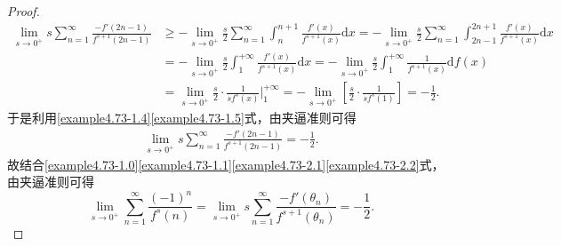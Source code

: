 \documentclass[../../main.tex]{subfiles}%
\begin{document}
\begin{proof}
\begin{align}
\underset{s\rightarrow 0^+}{\lim}s\sum_{n=1}^{\infty}{\frac{-f'\left( 2n-1 \right)}{f^{s+1}\left( 2n-1 \right)}}&\geqslant -\underset{s\rightarrow 0^+}{\lim}\frac{s}{2}\sum_{n=1}^{\infty}{\int_n^{n+1}{\frac{f'\left( x \right)}{f^{s+1}\left( x \right)}\mathrm{d}x}}=-\underset{s\rightarrow 0^+}{\lim}\frac{s}{2}\sum_{n=1}^{\infty}{\int_{2n-1}^{2n+1}{\frac{f'\left( x \right)}{f^{s+1}\left( x \right)}\mathrm{d}x}}
\nonumber
\\
&=-\underset{s\rightarrow 0^+}{\lim}\frac{s}{2}\int_1^{+\infty}{\frac{f'\left( x \right)}{f^{s+1}\left( x \right)}\mathrm{d}x}=-\underset{s\rightarrow 0^+}{\lim}\frac{s}{2}\int_1^{+\infty}{\frac{1}{f^{s+1}\left( x \right)}\mathrm{d}f\left( x \right)}
\nonumber
\\
&=\underset{s\rightarrow 0^+}{\lim}\frac{s}{2}\cdot \frac{1}{sf^s\left( x \right)}\Big|_{1}^{+\infty}=-\underset{s\rightarrow 0^+}{\lim}\left[ \frac{s}{2}\cdot \frac{1}{sf^s\left( 1 \right)} \right] =-\frac{1}{2}.\label{example4.73-1.5}
\end{align}
于是利用\eqref{example4.73-1.4}\eqref{example4.73-1.5}式，由夹逼准则可得
\begin{align}
\lim_{s\rightarrow 0^+}s\sum_{n = 1}^{\infty}\frac{-f'(2n - 1)}{f^{s + 1}(2n - 1)} = -\frac{1}{2}. \label{example4.73-2.2} 
\end{align}
故结合\eqref{example4.73-1.0}\eqref{example4.73-1.1}\eqref{example4.73-2.1}\eqref{example4.73-2.2}式，由夹逼准则可得
\[
\lim_{s\rightarrow 0^+} \sum_{n = 1}^{\infty}\frac{(-1)^n}{f^s(n)} = \lim_{s\rightarrow 0^+} s\sum_{n = 1}^{\infty}\frac{-f'(\theta_n)}{f^{s + 1}(\theta_n)} = -\frac{1}{2}.
\]

\end{proof}
\end{document}
